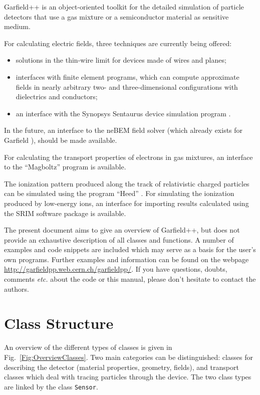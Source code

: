 Garfield++ is an object-oriented toolkit for the detailed simulation of 
particle detectors that use a gas mixture  
or a semiconductor material as sensitive medium. 

For calculating electric fields, three techniques are currently
being offered:
\begin{itemize}
  \item
  solutions in the thin-wire limit for devices made of wires and planes;
  \item
  interfaces with finite element programs, 
  which can compute approximate fields in nearly arbitrary 
  two- and three-dimensional configurations 
  with dielectrics and conductors;
  \item
  an interface with the Synopsys Sentaurus device simulation program
  \cite{Synopsys}.
\end{itemize}

In the future, an interface to the neBEM field solver 
\cite{Mukhopadhyay2007,Mukhopadhyay2006} 
(which already exists for Garfield \cite{GarfieldFortran}), 
should be made available.

For calculating the transport properties of electrons in gas 
mixtures, an interface to the ``Magboltz'' program 
\cite{BiagiMagboltz,Biagi1999} is available. 

The ionization pattern produced along the 
track of relativistic charged particles can be simulated using 
the program ``Heed'' \cite{Smirnov2005}.
For simulating the ionization produced by low-energy ions, 
an interface for importing results calculated using the 
SRIM software package \cite{Ziegler1985} 
is available.

The present document aims to give an overview of Garfield++, 
but does not provide an exhaustive 
description of all classes and functions.
A number of examples and code snippets are included 
which may serve as a basis for the user's own programs. 
Further examples and information can be found on the webpage 
\url{http://garfieldpp.web.cern.ch/garfieldpp/}.
If you have questions, doubts, comments \textit{etc.} about the code 
or this manual, please don't hesitate to contact the authors.
 
\section{Class Structure}

An overview of the different types of classes is given in 
Fig.~\ref{Fig:OverviewClasses}. 
Two main categories can be distinguished: 
classes for describing the detector 
(material properties, geometry, fields), 
and transport classes which deal with tracing particles 
through the device. 
The two class types are linked by the class \texttt{Sensor}.

